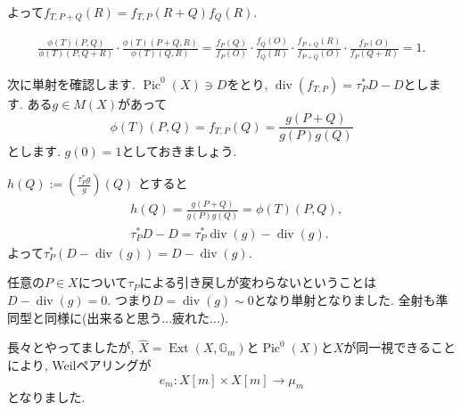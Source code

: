 \documentclass{jsarticle}
\newcommand{\GG}{\mathbb{G}}
\newcommand{\makeop}[1]{\mathop{\mathrm{#1}}\nolimits}
\def\Ext{\makeop{Ext}}
\def\Pic{\makeop{Pic}}
\def\div{\makeop{div}}
\theoremstyle{definition}
\numberwithin{theorem}{section}
\begin{document}
よって$f_{T, P+Q}(R) = f_{T, P}(R+Q) f_Q(R)$.

\begin{align*}
\frac{\phi(T)(P, Q) }{\phi(T)(P, Q+R)} \cdot \frac{\phi(T)(P+Q, R)}{\phi(T)(Q, R)}
= \frac{f_P(Q)}{f_P(O)} \cdot \frac{f_Q(O)}{f_Q(R)} \cdot \frac{f_{P+Q}(R)}{f_{P+Q}(O)} \cdot \frac{f_P(O)}{f_P(Q+R)}= 1.
\end{align*}

次に単射を確認します. $\Pic^0(X) \ni D$をとり, $\div(f_{T, P}) = \tau_P^*D - D$とします.
ある$g \in M(X)$があって
\[
\displaystyle\phi(T)(P, Q) = f_{T, P}(Q) = \frac{g(P+Q)}{g(P) g(Q)}
\]
とします. $g(0) = 1$としておきましょう.

$h(Q) := \left(\frac{\tau_P^*g}{g}\right)(Q)$ とすると
\begin{align*}
& h(Q) = \frac{g(P+Q)}{g(P)g(Q)} = \phi(T)(P, Q),\\
& \tau_P^*D - D =\tau_P^*\div(g) - \div(g).
\end{align*}
よって$\tau_P^*(D - \div(g)) = D - \div(g)$.

任意の$P \in X$について$\tau_P$による引き戻しが変わらないということは$D - \div(g) = 0$. つまり$D = \div(g) \sim 0$となり単射となりました. 全射も準同型と同様に(出来ると思う...疲れた...).

長々とやってましたが, $\hat{X} = \Ext(X, \GG_m)$と$\Pic^0(X)$と$X$が同一視できることにより, Weilペアリングが
\begin{equation*}
e_m: X[m] \times X[m] \rightarrow \mu_m
\end{equation*}
となりました.
\end{document}
